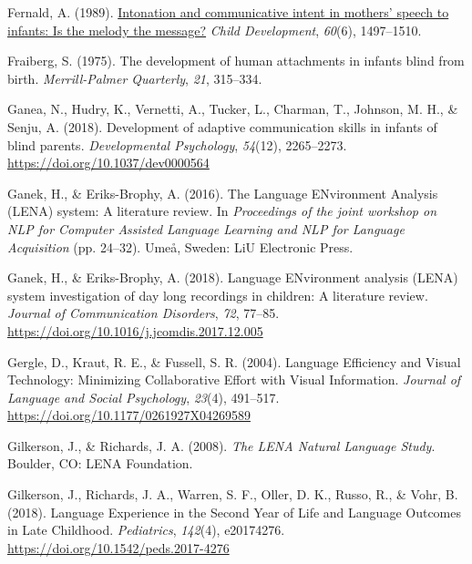 \documentclass[
  man,floatsintext]{apa6}
\newlength{\cslhangindent}
\newlength{\cslentryspacingunit} %
\newenvironment{CSLReferences}[2] %
 {%
  \setlength{\parindent}{0pt}
  \ifodd #1
  \let\oldpar\par
  \def\par{\hangindent=\cslhangindent\oldpar}
  \fi
  \setlength{\parskip}{#2\cslentryspacingunit}
 }%
 {}
\begin{document}
\begin{CSLReferences}{1}{0}
\leavevmode{}%
Fernald, A. (1989). \href{https://www.ncbi.nlm.nih.gov/pubmed/2612255}{Intonation and communicative intent in mothers' speech to infants: Is the melody the message?} \emph{Child Development}, \emph{60}(6), 1497--1510.

\leavevmode{}%
Fraiberg, S. (1975). The development of human attachments in infants blind from birth. \emph{Merrill-Palmer Quarterly}, \emph{21}, 315--334.

\leavevmode{}%
Ganea, N., Hudry, K., Vernetti, A., Tucker, L., Charman, T., Johnson, M. H., \& Senju, A. (2018). Development of adaptive communication skills in infants of blind parents. \emph{Developmental Psychology}, \emph{54}(12), 2265--2273. \url{https://doi.org/10.1037/dev0000564}

\leavevmode{}%
Ganek, H., \& Eriks-Brophy, A. (2016). The {Language ENvironment Analysis} ({LENA}) system: {A} literature review. In \emph{Proceedings of the joint workshop on {NLP} for {Computer Assisted Language Learning} and {NLP} for {Language Acquisition}} (pp. 24--32). {Umeå, Sweden}: {LiU Electronic Press}.

\leavevmode{}%
Ganek, H., \& Eriks-Brophy, A. (2018). Language {ENvironment} analysis ({LENA}) system investigation of day long recordings in children: {A} literature review. \emph{Journal of Communication Disorders}, \emph{72}, 77--85. \url{https://doi.org/10.1016/j.jcomdis.2017.12.005}

\leavevmode{}%
Gergle, D., Kraut, R. E., \& Fussell, S. R. (2004). Language {Efficiency} and {Visual Technology}: {Minimizing Collaborative Effort} with {Visual Information}. \emph{Journal of Language and Social Psychology}, \emph{23}(4), 491--517. \url{https://doi.org/10.1177/0261927X04269589}

\leavevmode{}%
Gilkerson, J., \& Richards, J. A. (2008). \emph{The {LENA Natural Language Study}}. {Boulder, CO}: {LENA Foundation}.

\leavevmode{}%
Gilkerson, J., Richards, J. A., Warren, S. F., Oller, D. K., Russo, R., \& Vohr, B. (2018). Language {Experience} in the {Second Year} of {Life} and {Language Outcomes} in {Late Childhood}. \emph{Pediatrics}, \emph{142}(4), e20174276. \url{https://doi.org/10.1542/peds.2017-4276}


\end{CSLReferences}
\end{document}
